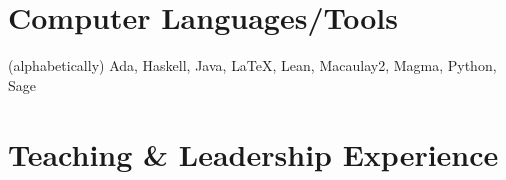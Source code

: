 \documentclass[a4paper,10pt]{article} %
\begin{document}

\section{Computer Languages/Tools}

(alphabetically) Ada, Haskell, Java, {\fb \LaTeX}, Lean, Macaulay2, Magma, Python, Sage


\section{Teaching \& Leadership Experience}
\end{document}

